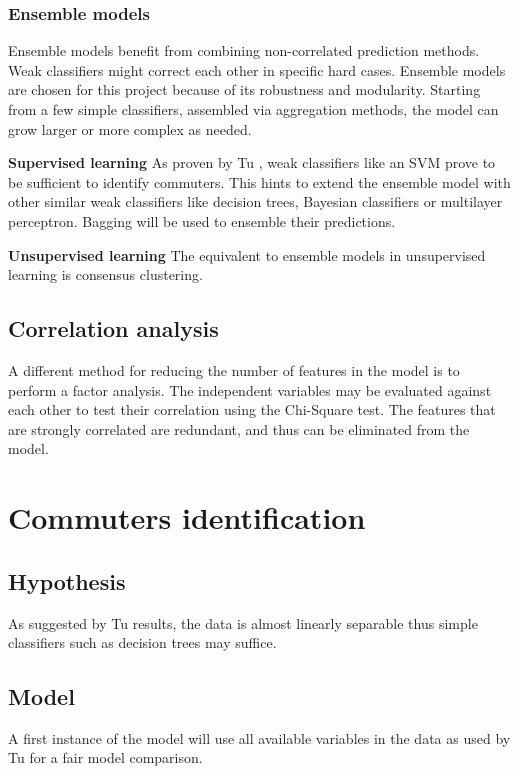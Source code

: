 \documentclass{article}
\begin{document}
\subsubsection{Ensemble models}
Ensemble models benefit from combining non-correlated prediction methods. Weak classifiers might correct each other in specific hard cases. Ensemble models are chosen for this project because of its robustness and modularity. Starting from a few simple classifiers, assembled via aggregation methods, the model can grow larger or more complex as needed.

\textbf{Supervised learning}
As proven by Tu \cite{tu2016impact}, weak classifiers like an SVM prove to be sufficient to identify commuters. This hints to extend the ensemble model with other similar weak classifiers like decision trees, Bayesian classifiers or multilayer perceptron. Bagging will be used to ensemble their predictions.

\textbf{Unsupervised learning}
The equivalent to ensemble models in unsupervised learning is consensus clustering.


\subsection{Correlation analysis}
A different method for reducing the number of features in the model is to perform a factor analysis. The independent variables may be evaluated against each other to test their correlation using the Chi-Square test. The features that are strongly correlated are redundant, and thus can be eliminated from the model. 

\newpage
\section{Commuters identification}
\label{sec:partI}
\subsection{Hypothesis}
As suggested by Tu \cite{tu2016impact} results, the data is almost linearly separable thus simple classifiers such as decision trees may suffice. 


\subsection{Model}
A first instance of the model will use all available variables in the data as used by Tu \cite{tu2016impact} for a fair model comparison. 
\end{document}

